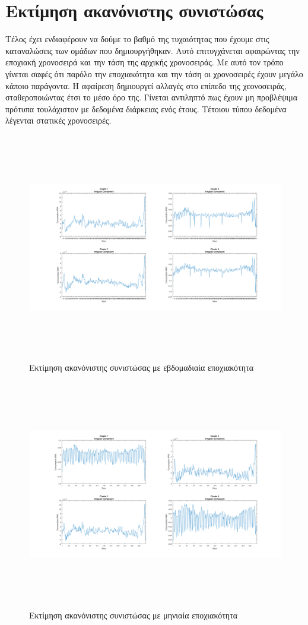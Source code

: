 \documentclass[a4paper, 11pt]{article}
\begin{document}
\section{Εκτίμηση ακανόνιστης συνιστώσας}
Τέλος έχει ενδιαφέρουν να δούμε το βαθμό της τυχαιότητας που έχουμε στις καταναλώσεις των ομάδων που δημιουργήθηκαν. Αυτό επιτυγχάνεται αφαιρώντας την εποχιακή χρονοσειρά και την τάση της αρχικής χρονοσειράς. Με αυτό τον τρόπο γίνεται σαφές ότι παρόλο την εποχιακότητα και την τάση οι χρονοσειρές έχουν μεγάλο κάποιο παράγοντα. Η αφαίρεση δημιουργεί αλλαγές στο επίπεδο της χεονοσειράς, σταθεροποιώντας έτσι το μέσο όρο της. Γίνεται αντιληπτό πως έχουν μη προβλέψιμα πρότυπα  τουλάχιστον με δεδομένα διάρκειας ενός έτους. Τέτοιου τύπου δεδομένα λέγενται στατικές χρονοσειρές.\cite{Stationary}
\begin{figure}[ht!]
\centering
\includegraphics[width=180mm, height=100mm]{../../plots/Trend_estimation/irregular_component_all.png}
\caption{Εκτίμηση ακανόνιστης συνιστώσας με εβδομαδιαία εποχιακότητα\label{irregularWeek}}
\end{figure}

\newpage
\begin{figure}[ht!]
\centering
\includegraphics[width=180mm, height=100mm]{../../plots/Trend_estimation/irregular_component_month_all.png}
\caption{Εκτίμηση ακανόνιστης συνιστώσας με μηνιαία εποχιακότητα\label{irregularMonth}}
\end{figure}
\end{document}
